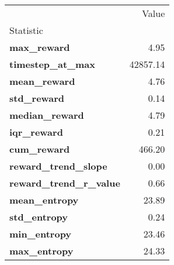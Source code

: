 \begin{tabular}{lr}
\toprule
 & Value \\
Statistic &  \\
\midrule
\textbf{max\_reward} & 4.95 \\
\textbf{timestep\_at\_max} & 42857.14 \\
\textbf{mean\_reward} & 4.76 \\
\textbf{std\_reward} & 0.14 \\
\textbf{median\_reward} & 4.79 \\
\textbf{iqr\_reward} & 0.21 \\
\textbf{cum\_reward} & 466.20 \\
\textbf{reward\_trend\_slope} & 0.00 \\
\textbf{reward\_trend\_r\_value} & 0.66 \\
\textbf{mean\_entropy} & 23.89 \\
\textbf{std\_entropy} & 0.24 \\
\textbf{min\_entropy} & 23.46 \\
\textbf{max\_entropy} & 24.33 \\
\bottomrule
\end{tabular}
